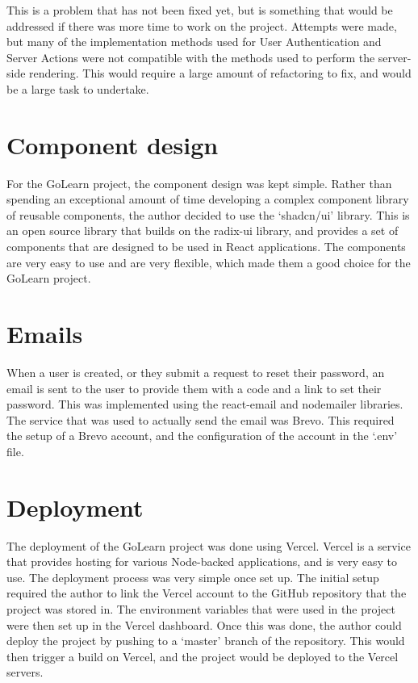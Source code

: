 \documentclass[11pt, a4paper,twoside]{report}
\theoremstyle{plain} %
\theoremstyle{definition} %
\numberwithin{equation}{chapter}
\begin{document}
This is a problem that has not been fixed yet, but is something that would be
addressed if there was more time to work on the project. Attempts were made,
but many of the implementation methods used for User Authentication and Server
Actions were not compatible with the methods used to perform the server-side
rendering. This would require a large amount of refactoring to fix, and would
be a large task to undertake.

\section{Component design}\label{sec:componentdesign}

For the GoLearn project, the component design was kept simple. Rather than
spending an exceptional amount of time developing a complex component
library of reusable components, the author decided to use the `shadcn/ui'
library. This is an open source library that builds on the radix-ui library,
and provides a set of components that are designed to be used in React
applications. The components are very easy to use and are very flexible, which
made them a good choice for the GoLearn project.

\section{Emails}\label{sec:emails}

When a user is created, or they submit a request to reset their password, an
email is sent to the user to provide them with a code and a link to set their
password. This was implemented using the react-email and nodemailer libraries.
The service that was used to actually send the email was Brevo. This required
the setup of a Brevo account, and the configuration of the account in the
`.env' file.

\section{Deployment}\label{sec:deployment}

The deployment of the GoLearn project was done using Vercel. Vercel is a
service that provides hosting for various Node-backed applications, and is very
easy to use. The deployment process was very simple once set up. The initial
setup required the author to link the Vercel account to the GitHub repository
that the project was stored in. The environment variables that were used in the
project were then set up in the Vercel dashboard. Once this was done, the
author could deploy the project by pushing to a `master' branch of the
repository. This would then trigger a build on Vercel, and the project would be
deployed to the Vercel servers.
\end{document}
